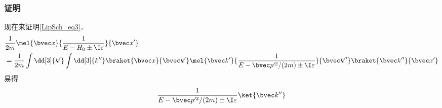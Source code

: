 \subsubsection{证明}
现在来证明\autoref{LipSch_eq3}．
\begin{equation}
\begin{aligned}
&\frac{1}{2m} \mel{\bvec x}{\frac{1}{E-H_0\pm \I\varepsilon}}{\bvec x'}\\
&= \frac{1}{2m} \int \dd[3]{k'} \int \dd[3]{k''} \braket{\bvec x}{\bvec k'}\mel{\bvec k'}{\frac{1}{E-\bvec p'^2/(2m)\pm \I\varepsilon}}{\bvec k''} \braket{\bvec k''}{\bvec x'}
\end{aligned}
\end{equation}
易得
\begin{equation}
\frac{1}{E-\bvec p'^2/(2m)\pm \I\varepsilon}\ket{\bvec k''}
\end{equation}

